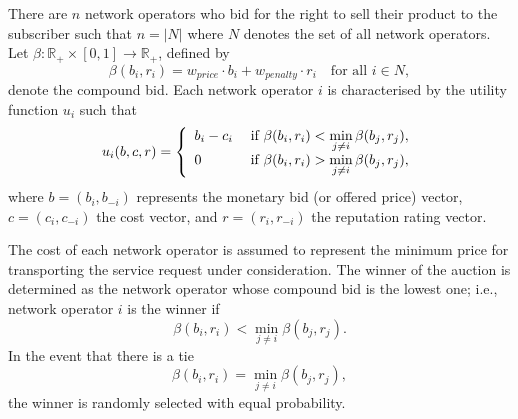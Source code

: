 There are $n$ network operators who bid for the right to sell their product to the subscriber such that $n = |N|$ where $N$ denotes the set of all network operators. Let $\beta : \mathbb{R}_+\times [0,1] \to \mathbb{R}_+$, defined by
\begin{equation}
	\label{eq:def_beta_direct}
	\beta(b_i, r_i) = w_{price}\cdot b_i + w_{penalty}\cdot r_i \quad\text{for all } i\in N,
\end{equation}
denote the compound bid. Each network operator $i$ is characterised by the utility function $u_i$ such that
\begin{equation}
	\label{eq:sellers_utility_direct}
	u_i(b,c,r) = \left\{
	\begin{array}{l l}
		b_i-c_i & \;\text{if } \beta(b_i, r_i) < \displaystyle\min_{j\neq i}\beta(b_j,r_j),\\
		0 & \;\text{if } \beta(b_i, r_i) > \displaystyle\min_{j\neq i}\beta(b_j,r_j),
	\end{array}\right.
\end{equation}
where $b = (b_i,b_{-i})$ represents the monetary bid (or offered price) vector, $c = (c_i, c_{-i})$ the cost vector, and $r = (r_i, r_{-i})$ the reputation rating vector.  

The cost of each network operator is assumed to represent the minimum price for transporting the service request under consideration. The winner of the auction is determined as the network operator whose compound bid is the lowest one; i.e., network operator $i$ is the winner if
\begin{equation}
	\beta(b_i, r_i) < \displaystyle\min_{j\neq i}\beta(b_j,r_j).
\end{equation}
In the event that there is a tie
\begin{equation}
	\beta(b_i, r_i) = \displaystyle\min_{j\neq i}\beta(b_j,r_j),
\end{equation}
the winner is randomly selected with equal probability.

